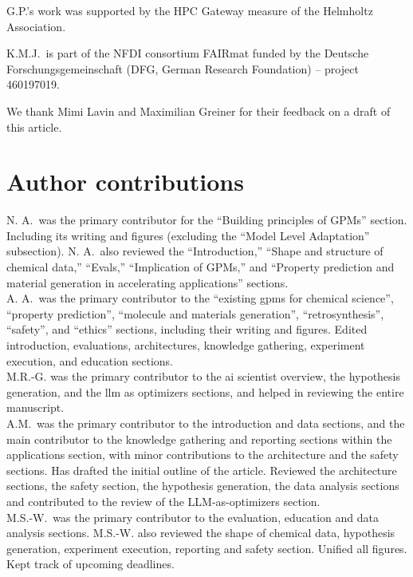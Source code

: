 \documentclass[11pt, oneside]{article}
\begin{document}
\noindent G.P.'s work was supported by the HPC Gateway measure of the Helmholtz Association.


\noindent K.M.J.\ is part of the NFDI consortium FAIRmat funded by the Deutsche Forschungsgemeinschaft (DFG, German Research Foundation) – project 460197019.

\noindent We thank Mimi Lavin and Maximilian Greiner for their feedback on a draft of this article.

\section*{Author contributions}
N. A.\ was the primary contributor for the \enquote{Building principles of GPMs} section. Including its writing and figures (excluding the \enquote{Model Level Adaptation} subsection). N. A.\ also reviewed the \enquote{Introduction,} \enquote{Shape and structure of chemical data,} \enquote{Evals,} \enquote{Implication of GPMs,} and \enquote{Property prediction and material generation in accelerating applications} sections. \\

\noindent A. A.\ was the primary contributor to the \enquote{existing \glspl{gpm} for chemical science}, \enquote{property prediction}, \enquote{molecule and materials generation}, \enquote{retrosynthesis}, \enquote{safety}, and \enquote{ethics} sections, including their writing and figures. Edited introduction, evaluations, architectures, knowledge gathering, experiment execution, and education sections. \\ 

\noindent M.R.-G. was the primary contributor to the \gls{ai} scientist overview, the hypothesis generation, and the \gls{llm} as optimizers sections, and helped in reviewing the entire manuscript. \\

\noindent A.M.\ was the primary contributor to the introduction and data sections, and the main contributor to the knowledge gathering and reporting sections within the applications section, with minor contributions to the architecture and the safety sections. Has drafted the initial outline of the article. Reviewed the architecture sections, the safety section, the hypothesis generation, the data analysis sections and contributed to the review of the LLM-as-optimizers section.\\

\noindent M.S.-W.\ was the primary contributor to the evaluation, education and data analysis sections. M.S.-W. also reviewed the shape of chemical data, hypothesis generation, experiment execution, reporting and safety section. Unified all figures. Kept track of upcoming deadlines. \\ 
\end{document}
